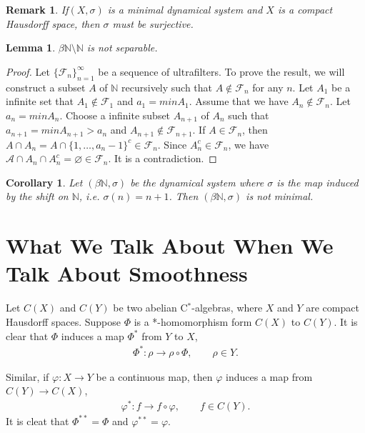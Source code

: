 \documentclass[a4paper,10pt]{amsart}
\newtheorem{corollary}{Corollary}[section]
\newtheorem{lemma}{Lemma}[section]
\newtheorem{remark}{Remark}[section]
\newcommand{\FFF}{\mathcal F}
\newcommand{\A}{\mathcal{A}}
\newcommand{\N}{\mathbb N} %
\begin{document}
\begin{remark}
    If$(X, \sigma)$ is a minimal dynamical system and $X$ is a compact 
    Hausdorff space, then $\sigma$ must be surjective. 
\end{remark}

\begin{lemma}
   $\beta \N \setminus \N$ is not separable. 
\end{lemma}
\begin{proof}
    Let $\{\FFF_n \}_{n=1}^{\infty}$ be a sequence of ultrafilters.
    To prove the result, we will construct a subset $A$ of $\N$ 
    recursively such that $A \notin \FFF_n$ for any $n$.
    Let $A_1$ be a infinite set that $A_1 \notin \FFF_1$ and 
    $a_1 = min A_{1}$. Assume that we have $A_n \notin \FFF_n$.
    Let $a_n = min A_{n}$. Choose a infinite subset $A_{n+1}$ of $A_n$ 
    such that $a_{n+1} = min A_{n+1} > a_n$ and $A_{n+1} \notin \FFF_{n+1}$.
    If $A \in \FFF_n$, then $A \cap A_n = 
    A \cap \{1, \ldots, a_n-1\}^{c} \in \FFF_n$. 
    Since $A_{n}^{c} \in \FFF_n$, we have $\A \cap A_n 
    \cap A_{n}^{c} = \varnothing \in \FFF_n$. It is a contradiction.
\end{proof}

\begin{corollary}
   Let $(\beta \N, \sigma)$ be the dynamical system where $\sigma$ is
   the map induced by the shift on $\N$, i.e. $\sigma(n) = n+1$. Then
   $(\beta \N, \sigma)$ is not minimal.
\end{corollary}



\section{What We Talk About When We Talk About Smoothness} 

Let $C(X)$ and $C(Y)$ be two abelian C$^*$-algebras, where
$X$ and $Y$ are compact Hausdorff spaces. Suppose $\varPhi$ 
is a *-homomorphism form $C(X)$ to $C(Y)$. It is clear that
$\varPhi$ induces a map $\varPhi^{*}$ from $Y$ to $X$,
\begin{align*}
    \varPhi^{*}: \rho \rightarrow \rho \circ \varPhi, \qquad
    \rho \in Y.
\end{align*}

Similar, if $\varphi: X \rightarrow Y$ be a continuous map, then
$\varphi$ induces a map from $C(Y) \rightarrow C(X)$,
\begin{align*}
    \varphi^{*}: f \rightarrow f \circ \varphi, \qquad 
    f \in C(Y).
\end{align*}
It is cleat that $\varPhi^{**} = \varPhi$ and $\varphi^{**} = \varphi$.
\end{document}
